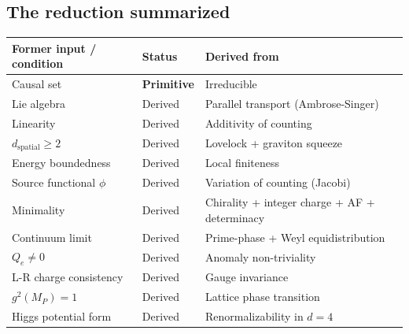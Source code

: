 \documentclass[11pt,letterpaper]{article}
\begin{document}
\subsection{The reduction summarized}

\begin{center}
\begin{tabular}{@{}lll@{}}
\toprule
Former input / condition & Status & Derived from \\
\midrule
Causal set & \textbf{Primitive} & Irreducible \\
Lie algebra & Derived & Parallel transport (Ambrose-Singer) \\
Linearity & Derived & Additivity of counting \\
$d_{\mathrm{spatial}} \geq 2$ & Derived & Lovelock + graviton squeeze \\
Energy boundedness & Derived & Local finiteness \\
Source functional $\phi$ & Derived & Variation of counting (Jacobi) \\
Minimality & Derived & Chirality + integer charge + AF + determinacy \\
Continuum limit & Derived & Prime-phase + Weyl equidistribution \\
$Q_e \neq 0$ & Derived & Anomaly non-triviality \\
L-R charge consistency & Derived & Gauge invariance \\
$g^2(M_P) = 1$ & Derived & Lattice phase transition \\
Higgs potential form & Derived & Renormalizability in $d = 4$ \\
\bottomrule
\end{tabular}
\end{center}
\end{document}
